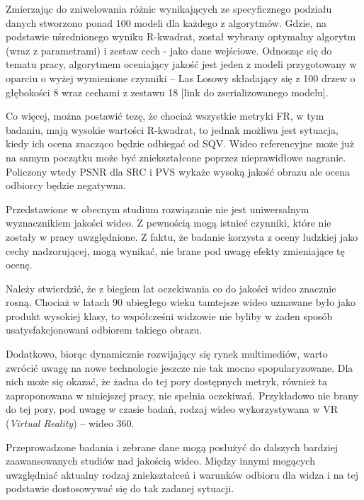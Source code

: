 Zmierzając do zniwelowania różnic wynikających ze specyficznego podziału danych stworzono ponad 100 modeli dla każdego z algorytmów. Gdzie, na podstawie uśrednionego wyniku R-kwadrat, został wybrany optymalny algorytm (wraz z parametrami) i zestaw cech - jako dane wejściowe. Odnosząc się do tematu pracy, algorytmem oceniający jakość jest jeden z modeli przygotowany w oparciu o wyżej wymienione czynniki -- Las Losowy składający się z 100 drzew o głębokości 8 wraz cechami z zestawu 18 [link do zserializowanego modelu].

Co więcej, można postawić tezę, że chociaż wszystkie metryki FR, w tym badaniu, mają wysokie wartości R-kwadrat, to jednak możliwa jest sytuacja, kiedy ich ocena znacząco będzie odbiegać od SQV. Wideo referencyjne może już na samym początku może być zniekształcone poprzez nieprawidłowe nagranie. Policzony wtedy PSNR dla SRC i PVS wykaże wysoką jakość obrazu ale ocena odbiorcy będzie negatywna.

Przedstawione w obecnym studium rozwiązanie nie jest uniwersalnym wyznacznikiem jakości wideo. Z pewnością mogą istnieć czynniki, które nie zostały w pracy uwzględnione. Z faktu, że badanie korzysta z oceny ludzkiej jako cechy nadzorującej, mogą wynikać, nie brane pod uwagę efekty zmieniające tę ocenę.

Należy stwierdzić, że z biegiem lat oczekiwania co do jakości wideo znacznie rosną. Chociaż w latach 90 ubiegłego wieku tamtejsze wideo uznawane było jako produkt wysokiej klasy, to współcześni widzowie nie byliby w żaden sposób usatysfakcjonowani odbiorem takiego obrazu. 

Dodatkowo, biorąc dynamicznie rozwijający się rynek multimediów, warto zwrócić uwagę na nowe technologie jeszcze nie tak mocno spopularyzowane. Dla nich może się okazać, że żadna do tej pory dostępnych metryk, również ta  zaproponowana w niniejszej pracy,  nie spełnia oczekiwań. Przykładowo nie brany do tej pory, pod uwagę w czasie badań, rodzaj wideo wykorzystywana w VR (\textit{Virtual Reality}) -- wideo 360.  

Przeprowadzone badania i zebrane dane mogą posłużyć do dalszych bardziej
zaawansowanych studiów nad jakością wideo. Między innymi mogących uwzględniać aktualny rodzaj zniekształceń i warunków odbioru dla widza i na tej podstawie dostosowywać się do tak zadanej sytuacji.


\label{cha:pierwszyDokument}









